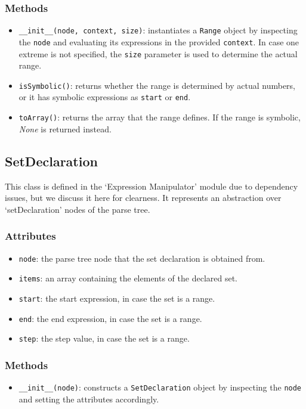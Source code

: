 \documentclass[12pt,a4paper]{report}
\theoremstyle{definition}
\theoremstyle{definition}
\theoremstyle{definition}
\begin{document}
\subsubsection{Methods}
\begin{itemize}
    \itemsep 0em
    \item \texttt{\_\_init\_\_(node, context, size)}: instantiates a \texttt{Range} object by inspecting the \texttt{node} and evaluating its expressions in the provided \texttt{context}. In case one extreme is not specified, the \texttt{size} parameter is used to determine the actual range.
    \item \texttt{isSymbolic()}: returns whether the range is determined by actual numbers, or it has symbolic expressions as \texttt{start} or \texttt{end}.
    \item \texttt{toArray()}: returns the array that the range defines. If the range is symbolic, \textit{None} is returned instead.
\end{itemize}


\subsection{SetDeclaration}
This class is defined in the `Expression Manipulator' module due to dependency issues, but we discuss it here for clearness. It represents an abstraction over `setDeclaration' nodes of the parse tree.
\subsubsection{Attributes}
\begin{itemize}
    \itemsep 0em
    \item \texttt{node}: the parse tree node that the set declaration is obtained from.
    \item \texttt{items}: an array containing the elements of the declared set.
    \item \texttt{start}: the start expression, in case the set is a range.
    \item \texttt{end}: the end expression, in case the set is a range.
    \item \texttt{step}: the step value, in case the set is a range.
\end{itemize}
\subsubsection{Methods}
\begin{itemize}
    \itemsep 0em
    \item \texttt{\_\_init\_\_(node)}: constructs a \texttt{SetDeclaration} object by inspecting the \texttt{node} and setting the attributes accordingly.
\end{itemize}
\end{document}
